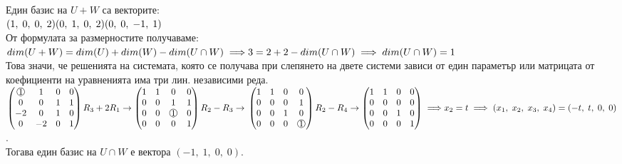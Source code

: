 \documentclass[12pt]{article}
\newcommand*{\mcirc}[1]{\text{\raisebox{.5pt}{\textcircled{\raisebox{-.9pt} {#1}}}}}
\begin{document}
Един базис на $U + W$ са векторите: \\

$(1, \; 0, \; 0, \; 2) \\
(0, \; 1, \; 0, \; 2) \\
(0, \; 0, \; -1, \; 1)$ \\

От формулата за размерностите получаваме: \\

$dim(U + W) = dim(U) + dim(W) - dim(U \cap W) \implies \\\\
3 = 2 + 2 - dim(U \cap W) \implies dim(U \cap W) = 1$ \\

Това значи, че  решенията на системата, която се получава при слепянето на двете системи зависи от един параметър
или матрицата от коефициенти на уравненията има три лин. независими реда. \\

$\begin{pmatrix}
     \mcirc{1} &  1 & 0 & 0 \\
     0 &  0 & 1 & 1 \\
    -2 &  0 & 1 & 0 \\
     0 & -2 & 0 & 1
\end{pmatrix} R_3 + 2R_1 \to \begin{pmatrix}
    1 & 1 & 0 & 0 \\
    0 & 0 & 1 & 1 \\
    0 & 0 & \mcirc{1} & 0 \\
    0 & 0 & 0 & 1
\end{pmatrix} R_2 - R_3 \to \\\\\\
\begin{pmatrix}
    1 & 1 & 0 & 0 \\
    0 & 0 & 0 & 1 \\
    0 & 0 & 1 & 0 \\
    0 & 0 & 0 & \mcirc{1}
\end{pmatrix} R_2 - R_4 \to \begin{pmatrix}
    1 & 1 & 0 & 0 \\
    0 & 0 & 0 & 0 \\
    0 & 0 & 1 & 0 \\
    0 & 0 & 0 & 1
\end{pmatrix} \implies \\\\\\
x_2 = t \implies (x_1, \; x_2, \; x_3, \; x_4) = (-t, \; t, \; 0, \; 0)$. \\

Тогава един базис на $U \cap W$ е вектора $(-1, \; 1, \; 0, \; 0)$.
\end{document}
